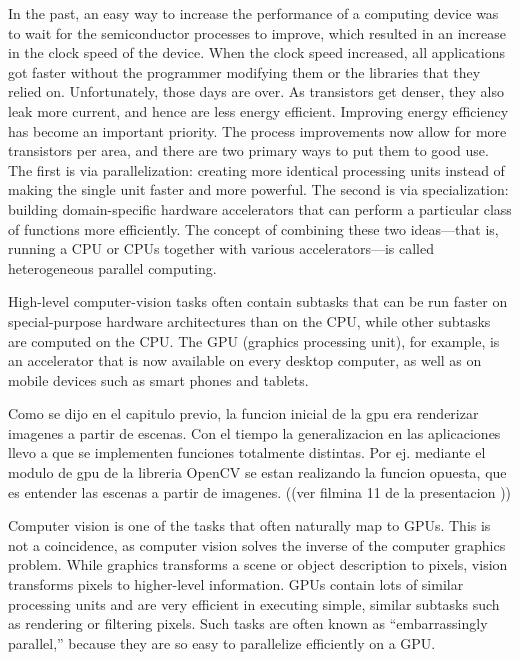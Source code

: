 \documentclass[a4paper,10pt]{report}
\begin{document}
In the past, an easy way to increase the performance of a computing device was to wait for the semiconductor processes to improve, which resulted in an increase in the clock speed of the device. When the clock speed increased, all applications got faster without the programmer modifying them or the libraries that they relied on. Unfortunately, those days are over.
As transistors get denser, they also leak more current, and hence are less energy efficient. Improving energy efficiency has become an important priority. The process improvements now allow for more transistors per area, and there are two primary ways to put them to good use. The first is via parallelization: creating more identical processing units instead of making the single unit faster and more powerful. The second is via specialization: building domain-specific hardware accelerators that can perform a particular class of functions more efficiently. The concept of combining these two ideas—that is, running a CPU or CPUs together with various accelerators—is called heterogeneous parallel computing.

High-level computer-vision tasks often contain subtasks that can be run faster on special-purpose hardware architectures than on the CPU, while other subtasks are computed on the CPU. The GPU (graphics processing unit), for example, is an accelerator that is now available on every desktop computer, as well as on mobile devices such as smart phones and tablets.







Como se dijo en el capitulo previo, la funcion inicial de la gpu era renderizar imagenes a partir de escenas. 
Con el tiempo la generalizacion en las aplicaciones llevo a que se implementen funciones totalmente distintas. 
Por ej. mediante el modulo de gpu de la libreria OpenCV se estan realizando la funcion opuesta, que es entender las escenas a partir de imagenes. ((ver filmina 11 de la presentacion ))

Computer vision is one of the tasks that often naturally map to GPUs. 
This is not a coincidence, as computer vision solves the inverse of the computer graphics problem.
While graphics transforms a scene or object description to pixels, vision transforms pixels to higher-level information. GPUs contain lots of similar processing units and are very efficient in executing simple, similar subtasks such as rendering or filtering pixels. Such tasks are often known as “embarrassingly parallel,” because they are so easy to parallelize efficiently on a GPU.
\end{document}
